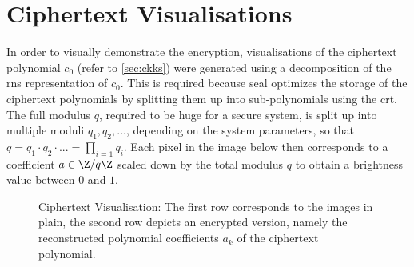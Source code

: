 \section{Ciphertext Visualisations}
In order to visually demonstrate the encryption, visualisations of the ciphertext polynomial $c_0$ (refer to \cref{sec:ckks}) were generated using a decomposition of the \gls{rns} representation of $c_0$.
This is required because \gls{seal} optimizes the storage of the ciphertext polynomials by splitting them up into sub-polynomials using the \gls{crt}.
The full modulus $q$, required to be huge for a secure system, is split up into multiple moduli $q_1, q_2, ...$, depending on the system parameters, so that $q = q_1 \cdot q_2 \cdot ... = \prod_{i=1} q_i$.
Each pixel in the image below then corresponds to a coefficient $a \in \Z / q\Z$ scaled down by the total modulus $q$ to obtain a brightness value between $0$ and $1$.

\vspace{8pt}
\begin{figure}[H]
  \centering
  \caption[Visualisation of the plain input images compared to their ciphertext]{Ciphertext Visualisation: The first row corresponds to the images in plain, the second row depicts an encrypted version, namely the reconstructed polynomial coefficients $a_k$ of the ciphertext polynomial.}
  \label{fig:ciphertext-visualisation}
\end{figure}
